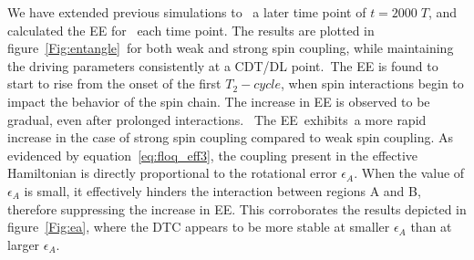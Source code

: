 \documentclass[12pt]{iopart}
\begin{document}
We have extended previous simulations to  a later time point of $t=2000\;T$, and calculated the EE for  each time point. The results are plotted in figure~\ref{Fig:entangle} for both weak and strong spin coupling, while maintaining the driving parameters consistently at a CDT/DL point. The EE is found to start to rise from the onset of the first $T_2-cycle$, when spin interactions begin to impact the behavior of the spin chain. The increase in EE is observed to be gradual, even after prolonged interactions.  The EE exhibits a more rapid increase in the case of strong spin coupling compared to weak spin coupling. As evidenced by equation~\eqref{eq:floq_eff3}, the coupling present in the effective Hamiltonian is directly proportional to the rotational error $\epsilon_A$. When the value of $\epsilon_A$ is small, it effectively hinders the interaction between regions A and B, therefore suppressing the increase in EE. This corroborates the results depicted in figure~\ref{Fig:ea}, where the DTC appears to be more stable at smaller $\epsilon_A$ than at larger $\epsilon_A$.
\end{document}

